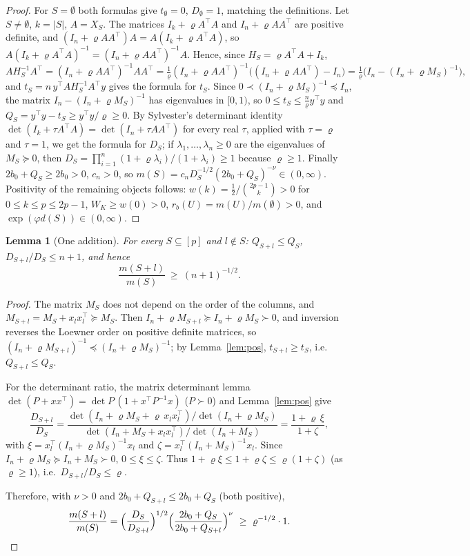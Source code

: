 \documentclass[11pt]{article}
\newtheorem{lemma}{Lemma}
\theoremstyle{remark}
\begin{document}
\begin{proof}
For $S=\emptyset$ both formulas give $t_\emptyset=0$, $D_\emptyset=1$, matching the definitions. Let $S\neq\emptyset$, $k=|S|$, $A=X_S$. The matrices $I_k+\varrho A^\top A$ and $I_n+\varrho AA^\top$ are positive definite, and $(I_n+\varrho AA^\top)A=A(I_k+\varrho A^\top A)$, so $A(I_k+\varrho A^\top A)^{-1}=(I_n+\varrho AA^\top)^{-1}A$. Hence, since $H_S=\varrho A^\top A+I_k$,
\[
AH_S^{-1}A^\top=(I_n+\varrho AA^\top)^{-1}AA^\top=\tfrac1\varrho(I_n+\varrho AA^\top)^{-1}\bigl((I_n+\varrho AA^\top)-I_n\bigr)=\tfrac1\varrho\bigl(I_n-(I_n+\varrho M_S)^{-1}\bigr),
\]
and $t_S=n\,y^\top AH_S^{-1}A^\top y$ gives the formula for $t_S$. Since $0\prec(I_n+\varrho M_S)^{-1}\preceq I_n$, the matrix $I_n-(I_n+\varrho M_S)^{-1}$ has eigenvalues in $[0,1)$, so $0\le t_S\le \frac{n}{\varrho} y^\top y$ and $Q_S=y^\top y-t_S\ge y^\top y/\varrho\ge 0$. By Sylvester's determinant identity $\det(I_k+\tau A^\top A)=\det(I_n+\tau AA^\top)$ for every real $\tau$, applied with $\tau=\varrho$ and $\tau=1$, we get the formula for $D_S$; if $\lambda_1,\dots,\lambda_n\ge0$ are the eigenvalues of $M_S\succeq0$, then $D_S=\prod_{i=1}^n(1+\varrho\lambda_i)/(1+\lambda_i)\ge1$ because $\varrho\ge1$. Finally $2b_0+Q_S\ge 2b_0>0$, $c_n>0$, so $m(S)=c_nD_S^{-1/2}(2b_0+Q_S)^{-\nu}\in(0,\infty)$. Positivity of the remaining objects follows: $w(k)=\tfrac12/\binom{2p-1}{k}>0$ for $0\le k\le p\le 2p-1$, $W_K\ge w(0)>0$, $r_b(U)=m(U)/m(\emptyset)>0$, and $\exp(\varphi d(S))\in(0,\infty)$.
\end{proof}

\begin{lemma}[One addition]\label{lem:add}
For every $S\subseteq[p]$ and $l\notin S$: $Q_{S+l}\le Q_S$, $D_{S+l}/D_S\le n+1$, and hence
\[
\frac{m(S+l)}{m(S)}\ \ge\ (n+1)^{-1/2}.
\]
\end{lemma}

\begin{proof}
The matrix $M_S$ does not depend on the order of the columns, and $M_{S+l}=M_S+x_lx_l^\top\succeq M_S$. Then $I_n+\varrho M_{S+l}\succeq I_n+\varrho M_S\succ0$, and inversion reverses the Loewner order on positive definite matrices, so $(I_n+\varrho M_{S+l})^{-1}\preceq (I_n+\varrho M_S)^{-1}$; by Lemma~\ref{lem:pos}, $t_{S+l}\ge t_S$, i.e.\ $Q_{S+l}\le Q_S$.

For the determinant ratio, the matrix determinant lemma $\det(P+xx^\top)=\det P\,(1+x^\top P^{-1}x)$ ($P\succ0$) and Lemma~\ref{lem:pos} give
\[
\frac{D_{S+l}}{D_S}=\frac{\det(I_n+\varrho M_S+\varrho\,x_lx_l^\top)/\det(I_n+\varrho M_S)}{\det(I_n+M_S+x_lx_l^\top)/\det(I_n+M_S)}=\frac{1+\varrho\,\xi}{1+\zeta},
\]
with $\xi=x_l^\top(I_n+\varrho M_S)^{-1}x_l$ and $\zeta=x_l^\top(I_n+M_S)^{-1}x_l$. Since $I_n+\varrho M_S\succeq I_n+M_S\succ0$, $0\le\xi\le\zeta$. Thus $1+\varrho\xi\le 1+\varrho\zeta\le \varrho(1+\zeta)$ (as $\varrho\ge1$), i.e.\ $D_{S+l}/D_S\le \varrho$.

Therefore, with $\nu>0$ and $2b_0+Q_{S+l}\le 2b_0+Q_S$ (both positive),
\[
\frac{m(S+l)}{m(S)}=\Bigl(\frac{D_S}{D_{S+l}}\Bigr)^{1/2}\Bigl(\frac{2b_0+Q_S}{2b_0+Q_{S+l}}\Bigr)^{\nu}\ \ge\ \varrho^{-1/2}\cdot 1 .\qedhere
\]
\end{proof}
\end{document}

